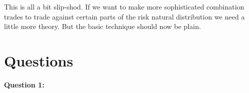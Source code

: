 
This is all a bit slip-shod. If we want to make more sophisticated combination trades to trade against certain parts of the risk natural distribution we need a little more theory. But the basic technique should now be plain. 







\section*{Questions}

\textbf{Question 1:} \\


